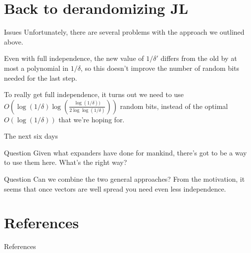\documentclass[10pt]{beamer}
\renewcommand{\l}{\left}
\renewcommand{\r}{\right}
\begin{document}

\section{Back to derandomizing JL}
\label{sec:}

\begin{frame}
  \sectionpage
\end{frame}

\begin{frame}{Issues}
  Unfortunately, there are several problems with the approach we
  outlined above.

  \pause\bigskip\bigskip

  Even with full independence, the new value of $1/\delta'$ differs
  from the old by at most a polynomial in $1/\delta$, so this doesn't
  improve the number of random bits needed for the last step.

  \pause\bigskip\bigskip

  To really get full independence, it turns out we need to use
  $O\l(\log(1/\delta)
  \log\l(\frac{\log(1/\delta))}{2\log\log(1/\delta)}\r)\r)$ random
  bits, instead of the optimal $O(\log(1/\delta))$ that we're hoping
  for.
\end{frame}


\begin{frame}{The next six days}
  \begin{block}{Question}
    Given what expanders have done for mankind, there's got to be a way
    to use them here. What's the right way?
  \end{block}

  \pause\bigskip\bigskip

  \begin{block}{Question}
    Can we combine the two general approaches? From the motivation, it
    seems that once vectors are well spread you need even less
    independence.
  \end{block}
\end{frame}


\section{References}

\begin{frame}[allowframebreaks]{References}
  \nocite{*}
  
  
\end{frame}

\end{document}
